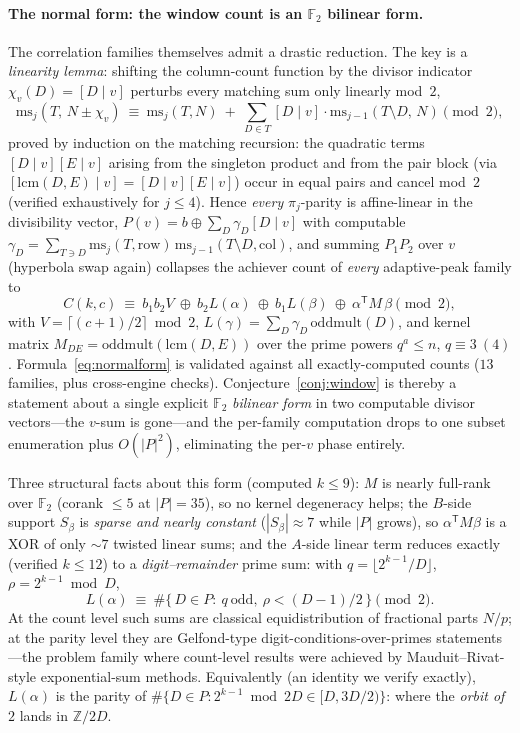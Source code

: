 \documentclass[11pt]{article}
\theoremstyle{remark}\newtheorem{remark}[theorem]{Remark}
\begin{document}
\paragraph{The normal form: the window count is an $\mathbb F_2$ bilinear form.} The correlation
families themselves admit a drastic reduction. The key is a \emph{linearity lemma}: shifting the
column-count function by the divisor indicator $\chi_v(D)=[D\mid v]$ perturbs every matching sum only
linearly mod~$2$,
\[
   \mathrm{ms}_j(T,\,N\pm\chi_v)\ \equiv\ \mathrm{ms}_j(T,N)\ +\ \sum_{D\in T}[D\mid v]\cdot
   \mathrm{ms}_{j-1}(T\setminus D,\,N)\pmod2,
\]
proved by induction on the matching recursion: the quadratic terms $[D\mid v][E\mid v]$ arising from
the singleton product and from the pair block (via $[\mathrm{lcm}(D,E)\mid v]=[D\mid v][E\mid v]$)
occur in equal pairs and cancel mod~$2$ (verified exhaustively for $j\le4$). Hence \emph{every}
$\pi_j$-parity is affine-linear in the divisibility vector, $P(v)=b\oplus\sum_D\gamma_D[D\mid v]$ with
computable $\gamma_D=\sum_{T\ni D}\mathrm{ms}_j(T,\mathrm{row})\,\mathrm{ms}_{j-1}(T\setminus
D,\mathrm{col})$, and summing $P_1P_2$ over $v$ (hyperbola swap again) collapses the achiever count of
\emph{every} adaptive-peak family to
\begin{equation}\label{eq:normalform}
   C(k,c)\ \equiv\ b_1b_2V\ \oplus\ b_2L(\alpha)\ \oplus\ b_1L(\beta)\ \oplus\
   \alpha^{\mathsf T}M\,\beta \pmod 2,
\end{equation}
with $V=\lceil(c{+}1)/2\rceil\bmod2$, $L(\gamma)=\sum_D\gamma_D\,\mathrm{oddmult}(D)$, and kernel
matrix $M_{DE}=\mathrm{oddmult}(\mathrm{lcm}(D,E))$ over the prime powers $q^a\le n$, $q\equiv3\ (4)$.
Formula~\eqref{eq:normalform} is validated against all exactly-computed counts ($13$ families, plus
cross-engine checks). Conjecture~\ref{conj:window} is thereby a statement about a single explicit
$\mathbb F_2$ \emph{bilinear form} in two computable divisor vectors---the $v$-sum is gone---and the
per-family computation drops to one subset enumeration plus $O(|P|^2)$, eliminating the
per-$v$ phase entirely.

Three structural facts about this form (computed $k\le9$): $M$ is nearly full-rank over $\mathbb F_2$
(corank $\le5$ at $|P|=35$), so no kernel degeneracy helps; the $B$-side support $S_\beta$ is
\emph{sparse and nearly constant} ($|S_\beta|\approx7$ while $|P|$ grows), so
$\alpha^{\mathsf T}M\beta$ is a XOR of only $\sim\!7$ twisted linear sums; and the $A$-side linear
term reduces exactly (verified $k\le12$) to a \emph{digit--remainder} prime sum: with
$q=\lfloor2^{k-1}/D\rfloor$, $\rho=2^{k-1}\bmod D$,
\[
   L(\alpha)\ \equiv\ \#\{\,D\in P:\ q\ \text{odd},\ \rho<(D{-}1)/2\,\}\pmod2 .
\]
At the count level such sums are classical equidistribution of fractional parts $N/p$; at the parity
level they are Gelfond-type digit-conditions-over-primes statements---the problem family where
count-level results were achieved by Mauduit--Rivat-style exponential-sum methods. Equivalently (an
identity we verify exactly), $L(\alpha)$ is the parity of $\#\{D\in P:2^{k-1}\bmod 2D\in[D,3D/2)\}$:
where the \emph{orbit of $2$} lands in $\mathbb Z/2D$.
\end{document}
